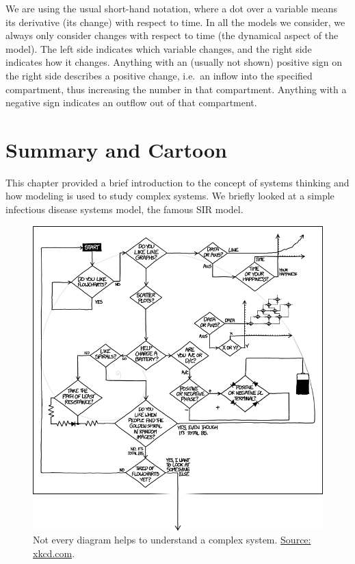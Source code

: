 \documentclass[]{book}
\theoremstyle{definition}
\theoremstyle{definition}
\theoremstyle{definition}
\theoremstyle{remark}
\begin{document}
We are using the usual short-hand notation, where a dot over a variable
means its derivative (its change) with respect to time. In all the
models we consider, we always only consider changes with respect to time
(the dynamical aspect of the model). The left side indicates which
variable changes, and the right side indicates how it changes. Anything
with an (usually not shown) positive sign on the right side describes a
positive change, i.e.~an inflow into the specified compartment, thus
increasing the number in that compartment. Anything with a negative sign
indicates an outflow out of that compartment.

\section{Summary and Cartoon}\label{summary-and-cartoon}

This chapter provided a brief introduction to the concept of systems
thinking and how modeling is used to study complex systems. We briefly
looked at a simple infectious disease systems model, the famous SIR
model.

\begin{figure}
\centering
\includegraphics{./images/xkcd-flowcharts.png}
\caption{\label{fig:complexcartoon}Not every diagram helps to understand a
complex system. \href{https://xkcd.com/1488/}{Source: xkcd.com}.}
\end{figure}
\end{document}
